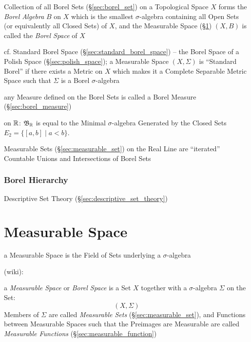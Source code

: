 Collection of all Borel Sets (\S\ref{sec:borel_set}) on a Topological Space $X$
forms the \emph{Borel Algebra} $B$ on $X$ which is the smallest $\sigma$-algebra
containing all Open Sets (or equivalently all Closed Sets) of $X$, and the
Measurable Space (\S\ref{sec:measurable_space}) $(X,B)$ is called the
\emph{Borel Space} of $X$

\fist cf. Standard Borel Space (\S\ref{sec:standard_borel_space}) -- the Borel
Space of a Polish Space (\S\ref{sec:polish_space}); a Measurable Space $(X,
\Sigma)$ is ``Standard Borel'' if there exists a Metric on $X$ which makes it a
Complete Separable Metric Space such that $\Sigma$ is a Borel $\sigma$-algebra

any Measure defined on the Borel Sets is called a Borel Measure
(\S\ref{sec:borel_measure})

on $\mathbb{R}$: $\mathfrak{B}_{\mathbb{R}}$ is equal to the Minimal $\sigma$-algebra
Generated by the Closed Sets $E_2 = \{ [a,b] \;|\; a < b \}$.

Measurable Sets (\S\ref{sec:measurable_set}) on the Real Line are ``iterated''
Countable Unions and Intersections of Borel Sets



\subsubsection{Borel Hierarchy}\label{sec:borel_hierarchy}\hfill

\fist Descriptive Set Theory (\S\ref{sec:descriptive_set_theory})



\section{Measurable Space}\label{sec:measurable_space}

a Measurable Space is the Field of Sets underlying a $\sigma$-algebra

(wiki):

a \emph{Measurable Space} or \emph{Borel Space} is a Set $X$ together with a
$\sigma$-algebra $\Sigma$ on the Set:
\[
  (X,\Sigma)
\]
Members of $\Sigma$ are called \emph{Measurable Sets}
(\S\ref{sec:measurable_set}), and Functions between Measurable Spaces such that
the Preimages are Measurable are called \emph{Measurable Functions}
(\S\ref{sec:measurable_function})

